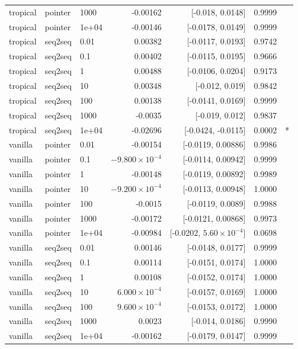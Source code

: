 \documentclass[10pt]{article}
\begin{document}
{\begin{longtable}{lllrrrl}
tropical & pointer & 1000 & -0.00162 & [-0.018, 0.0148] & 0.9999 & \\
tropical & pointer & 1e+04 & -0.00146 & [-0.0178, 0.0149] & 0.9999 & \\
tropical & seq2seq & 0.01 & 0.00382 & [-0.0117, 0.0193] & 0.9742 & \\
tropical & seq2seq & 0.1 & 0.00402 & [-0.0115, 0.0195] & 0.9666 & \\
tropical & seq2seq & 1 & 0.00488 & [-0.0106, 0.0204] & 0.9173 & \\
tropical & seq2seq & 10 & 0.00348 & [-0.012, 0.019] & 0.9842 & \\
tropical & seq2seq & 100 & 0.00138 & [-0.0141, 0.0169] & 0.9999 & \\
tropical & seq2seq & 1000 & -0.0035 & [-0.019, 0.012] & 0.9837 & \\
tropical & seq2seq & 1e+04 & -0.02696 & [-0.0424, -0.0115] & 0.0002 & *\\
vanilla & pointer & 0.01 & -0.00154 & [-0.0119, 0.00886] & 0.9986 & \\
vanilla & pointer & 0.1 & $-9.800\times10^{-4}$ & [-0.0114, 0.00942] & 0.9999 & \\
vanilla & pointer & 1 & -0.00148 & [-0.0119, 0.00892] & 0.9989 & \\
vanilla & pointer & 10 & $-9.200\times10^{-4}$ & [-0.0113, 0.00948] & 1.0000 & \\
vanilla & pointer & 100 & -0.0015 & [-0.0119, 0.0089] & 0.9988 & \\
vanilla & pointer & 1000 & -0.00172 & [-0.0121, 0.00868] & 0.9973 & \\
vanilla & pointer & 1e+04 & -0.00984 & [-0.0202, $5.60\times10^{-4}$] & 0.0698 & \\
vanilla & seq2seq & 0.01 & 0.00146 & [-0.0148, 0.0177] & 0.9999 & \\
vanilla & seq2seq & 0.1 & 0.00114 & [-0.0151, 0.0174] & 1.0000 & \\
vanilla & seq2seq & 1 & 0.00108 & [-0.0152, 0.0174] & 1.0000 & \\
vanilla & seq2seq & 10 & $6.000\times10^{-4}$ & [-0.0157, 0.0169] & 1.0000 & \\
vanilla & seq2seq & 100 & $9.600\times10^{-4}$ & [-0.0153, 0.0172] & 1.0000 & \\
vanilla & seq2seq & 1000 & 0.0023 & [-0.014, 0.0186] & 0.9990 & \\
vanilla & seq2seq & 1e+04 & -0.00162 & [-0.0179, 0.0147] & 0.9999 & \\
\bottomrule
\end{longtable}
}
\end{document}
